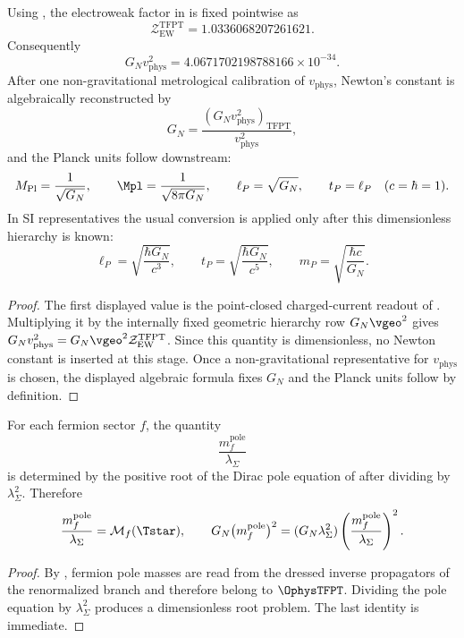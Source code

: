 \begin{corollary}
\label{cor:point-closed-planck-reconstruction}
Using , the electroweak factor in
 is fixed pointwise as
\[
\mathcal Z_{\mathrm{EW}}^{\mathrm{TFPT}}
=
1.0336068207261621.
\]
Consequently
\[
G_Nv_{\mathrm{phys}}^2
=
4.0671702198788166\times10^{-34}.
\]
After one non-gravitational metrological calibration of $v_{\mathrm{phys}}$, Newton's constant is
algebraically reconstructed by
\[
G_N=
\frac{(G_Nv_{\mathrm{phys}}^2)_{\mathrm{TFPT}}}{v_{\mathrm{phys}}^2},
\]
and the Planck units follow downstream:
\[
M_{\mathrm{Pl}}=\frac{1}{\sqrt{G_N}},
\qquad
\Mpl=\frac{1}{\sqrt{8\pi G_N}},
\qquad
\ell_P=\sqrt{G_N},
\qquad
t_P=\ell_P
\quad(c=\hbar=1).
\]
In SI representatives the usual conversion is applied only after this dimensionless hierarchy is
known:
\[
\ell_P=\sqrt{\frac{\hbar G_N}{c^3}},
\qquad
t_P=\sqrt{\frac{\hbar G_N}{c^5}},
\qquad
m_P=\sqrt{\frac{\hbar c}{G_N}}.
\]
\end{corollary}

\begin{proof}
The first displayed value is the point-closed charged-current readout of
. Multiplying it by the internally fixed geometric hierarchy
row $G_N\vgeo^2$ gives $G_Nv_{\mathrm{phys}}^2=G_N\vgeo^2\mathcal Z_{\mathrm{EW}}^{\mathrm{TFPT}}$.
Since this quantity is dimensionless, no Newton constant is inserted at this stage. Once a
non-gravitational representative for $v_{\mathrm{phys}}$ is chosen, the displayed algebraic formula
fixes $G_N$ and the Planck units follow by definition.
\end{proof}


\begin{theorem}
\label{thm:dimensionless-pole-mass-readout}
For each fermion sector $f$, the quantity
\[
\frac{m_f^{\mathrm{pole}}}{\lambda_\Sigma}
\]
is determined by the positive root of the Dirac pole equation of
 after dividing by $\lambda_\Sigma^2$. Therefore
\[
\frac{m_f^{\mathrm{pole}}}{\lambda_\Sigma}
=
\mathcal M_f(\Tstar),
\qquad
G_N\bigl(m_f^{\mathrm{pole}}\bigr)^2
=
(G_N\lambda_\Sigma^2)\left(\frac{m_f^{\mathrm{pole}}}{\lambda_\Sigma}\right)^2.
\]
\end{theorem}

\begin{proof}
By , fermion pole masses are read from the dressed inverse propagators
of the renormalized branch and therefore belong to $\OphysTFPT$. Dividing the pole equation by
$\lambda_\Sigma^2$ produces a dimensionless root problem. The last identity is immediate.
\end{proof}

